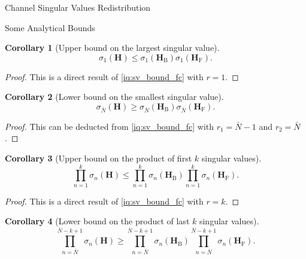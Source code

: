 \documentclass[journal]{IEEEtran}
\newtheorem{corollary}{Corollary}[proposition]
\begin{document}
\begin{section}{Channel Singular Values Redistribution}
\begin{subsection}{Some Analytical Bounds}
		\begin{corollary}[Upper bound on the largest singular value\label{co:sv_largest}]
			\begin{equation}
				\sigma_1(\mathbf{H}) \le \sigma_1(\mathbf{H}_\mathrm{B}) \sigma_1(\mathbf{H}_\mathrm{F}).
			\end{equation}
		\end{corollary}

		\begin{proof}
			This is a direct result of \eqref{iq:sv_bound_fc} with $r = 1$.
		\end{proof}

		\begin{corollary}[Lower bound on the smallest singular value\label{co:sv_smallest}]
			\begin{equation}
				\sigma_{\bar{N}}(\mathbf{H}) \ge \sigma_{\bar{N}}(\mathbf{H}_\mathrm{B}) \sigma_{\bar{N}}(\mathbf{H}_\mathrm{F}).
			\end{equation}
		\end{corollary}

		\begin{proof}
			This can be deducted from \eqref{iq:sv_bound_fc} with $r_1 = \bar{N}{-}1$ and $r_2 = \bar{N}$.
		\end{proof}

		\begin{corollary}[Upper bound on the product of first $k$ singular values]
			\begin{equation}
				\prod_{n=1}^k \sigma_n(\mathbf{H}) \le \prod_{n=1}^k \sigma_n(\mathbf{H}_\mathrm{B}) \prod_{n=1}^k \sigma_n(\mathbf{H}_\mathrm{F}).
			\end{equation}
		\end{corollary}

		\begin{proof}
			This is a direct result of \eqref{iq:sv_bound_fc} with $r = k$.
		\end{proof}

		\begin{corollary}[Lower bound on the product of last $k$ singular values\label{co:sv_product_smallest}]
			\begin{equation}
				\prod_{n=\bar{N}}^{\bar{N}-k+1} \sigma_n(\mathbf{H}) \ge \prod_{n=\bar{N}}^{\bar{N}-k+1} \sigma_n(\mathbf{H}_\mathrm{B}) \prod_{n=\bar{N}}^{\bar{N}-k+1} \sigma_n(\mathbf{H}_\mathrm{F}).
			\end{equation}
		\end{corollary}


\end{subsection}
\end{section}
\end{document}
